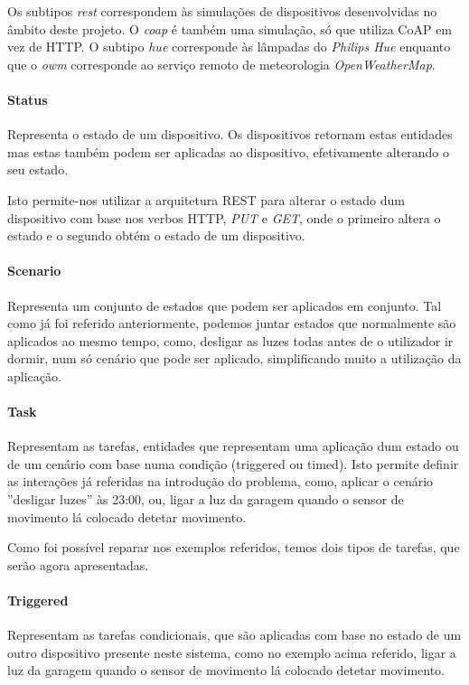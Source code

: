 Os subtipos \textit{rest} correspondem às simulações de dispositivos desenvolvidas no âmbito deste projeto. O \textit{coap} é também uma simulação, só que utiliza CoAP em vez de HTTP. O subtipo \textit{hue} corresponde às lâmpadas do \textit{Philips Hue} enquanto que o \textit{owm} corresponde ao serviço remoto de meteorologia \textit{OpenWeatherMap}.

\paragraph*{Status}
Representa o estado de um dispositivo. Os dispositivos retornam estas entidades mas estas também podem ser aplicadas ao dispositivo, efetivamente alterando o seu estado.

Isto permite-nos utilizar a arquitetura REST para alterar o estado dum dispositivo com base nos verbos HTTP, \textit{PUT} e \textit{GET}, onde o primeiro altera o estado e o segundo obtém o estado de um dispositivo.

\paragraph*{Scenario}
Representa um conjunto de estados que podem ser aplicados em conjunto. Tal como já foi referido anteriormente, podemos juntar estados que normalmente são aplicados ao mesmo tempo, como, desligar as luzes todas antes de o utilizador ir dormir, num só cenário que pode ser aplicado, simplificando muito a utilização da aplicação.

\paragraph*{Task}
Representam as tarefas, entidades que representam uma aplicação dum estado ou de um cenário com base numa condição (triggered ou timed). Isto permite definir as interações já referidas na introdução do problema, como, aplicar o cenário ''desligar luzes'' às 23:00, ou, ligar a luz da garagem quando o sensor de movimento lá colocado detetar movimento.

Como foi possível reparar nos exemplos referidos, temos dois tipos de tarefas, que serão agora apresentadas.

\paragraph*{Triggered}
Representam as tarefas condicionais, que são aplicadas com base no estado de um outro dispositivo presente neste sistema, como no exemplo acima referido, ligar a luz da garagem quando o sensor de movimento lá colocado detetar movimento.

